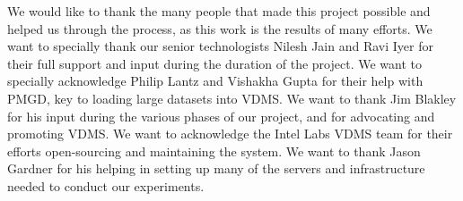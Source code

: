 
\begin{acks}
We would like to thank the many people that made this project possible and
helped us through the process, as this work is the results of many efforts.
We want to specially thank our senior technologists Nilesh Jain and
Ravi Iyer for their full support and input during the duration of the project.
We want to specially acknowledge Philip Lantz and Vishakha Gupta for their help
with PMGD, key to loading large datasets into VDMS.
We want to thank Jim Blakley for his input during the various
phases of our project, and for advocating and promoting VDMS.
We want to acknowledge the Intel Labs VDMS team for their efforts
open-sourcing and maintaining the system.
We want to thank Jason Gardner for his helping in setting up many of
the servers and infrastructure needed to conduct our experiments.
\end{acks}